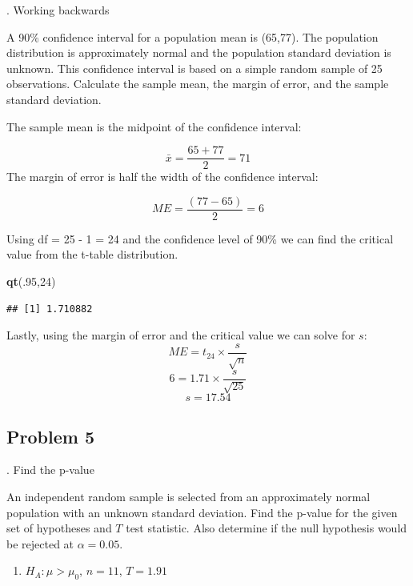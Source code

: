 \documentclass[
]{book}
\newenvironment{Shaded}{\begin{snugshade}}{\end{snugshade}}
\newcommand{\DecValTok}[1]{\textcolor[rgb]{0.00,0.00,0.81}{#1}}
\newcommand{\KeywordTok}[1]{\textcolor[rgb]{0.13,0.29,0.53}{\textbf{#1}}}
\newcommand{\NormalTok}[1]{#1}
\providecommand{\tightlist}{%
  \setlength{\itemsep}{0pt}\setlength{\parskip}{0pt}}
\begin{document}
. Working backwards

A 90\% confidence interval for a population mean is (65,77). The population distribution is approximately normal and the population standard deviation is unknown. This confidence interval is based on a simple random sample of 25 observations. Calculate the sample mean, the margin of error, and the sample standard deviation.

The sample mean is the midpoint of the confidence interval:

\[\bar{x} = \frac{65+77}{2} = 71\]
The margin of error is half the width of the confidence interval:

\[ME = \frac{ \left(77 - 65 \right)}{2} = 6 \]

Using df = 25 - 1 = 24 and the confidence level of 90\% we can find the critical value from the t-table distribution.

\begin{Shaded}
\begin{Highlighting}[]
\KeywordTok{qt}\NormalTok{(.}\DecValTok{95}\NormalTok{,}\DecValTok{24}\NormalTok{)}
\end{Highlighting}
\end{Shaded}

\begin{verbatim}
## [1] 1.710882
\end{verbatim}

Lastly, using the margin of error and the critical value we can solve for \(s\):
\[ ME = t_{24}\times \frac{s}{\sqrt{n}}\]
\[6 = 1.71\times \frac{s}{\sqrt{25}}\]
\[s = 17.54\]

\hypertarget{problem-5-8}{%
\subsection{Problem 5}\label{problem-5-8}}

. Find the p-value

An independent random sample is selected from an approximately normal population with an unknown standard deviation. Find the p-value for the given set of hypotheses and \(T\) test statistic. Also determine if the null hypothesis would be rejected at \(\alpha = 0.05\).

\begin{enumerate}
\def\labelenumi{\alph{enumi}.}
\tightlist
\item
  \(H_{A}: \mu > \mu_{0}\), \(n = 11\), \(T = 1.91\)
\end{enumerate}
\end{document}
